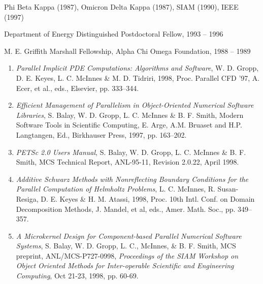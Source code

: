 \itemskip
{}
\begin{description}
\item
Phi Beta Kappa (1987), Omicron Delta Kappa (1987), SIAM (1990), IEEE (1997)
\end{description}

\itemskip
{}
\begin{description}
\item
Department of Energy Distinguished Postdoctoral Fellow, 1993 -- 1996
\item
M. E. Griffith Marshall Fellowship, Alpha Chi Omega Foundation, 1988 -- 1989
\end{description}
 

\itemskip
{}
\begin{enumerate}
\item
{\em Parallel Implicit PDE Computations: Algorithms and Software},
W. D. Gropp, D. E. Keyes, L. C. McInnes \& M. D. Tidriri, 1998,
Proc. Parallel CFD '97, A. Ecer, et al., eds., 
Elsevier, pp. 333--344. 
\item
{\it Efficient Management of Parallelism in Object-Oriented Numerical
Software Libraries}, S. Balay, W. D. Gropp, L. C. McInnes \& B. F. Smith, 
Modern Software Tools in Scientific Computing, E. Arge, 
A.M. Bruaset and H.P. Langtangen, Ed., Birkhauser Press, 1997, pp. 163--202. 
\item
{\it PETSc 2.0 Users Manual}, S. Balay, W. D. Gropp, L. C. McInnes \& B. F. Smith,
MCS Technical Report, ANL-95-11, Revision 2.0.22, April 1998.
\item
{\em Additive Schwarz Methods with Nonreflecting Boundary
Conditions for the Parallel Computation of Helmholtz Problems},
L. C. McInnes, R. Susan-Resiga, D. E. Keyes \& H. M. Atassi, 
1998, Proc. 10th Intl. Conf. on Domain Decomposition
Methods, J. Mandel, et al, eds., Amer. Math. Soc., pp. 349--357. 
\newpage

\item
{\it A Microkernel Design for Component-based Parallel Numerical
Software Systems}, S. Balay, W. D. Gropp, L. C., McInnes, \& B. F. Smith, MCS preprint,
ANL/MCS-P727-0998, {\it Proceedings of the SIAM Workshop on
Object Oriented Methods for Inter-operable Scientific and Engineering
Computing}, Oct 21-23, 1998, pp. 60-69.

\end{enumerate}

